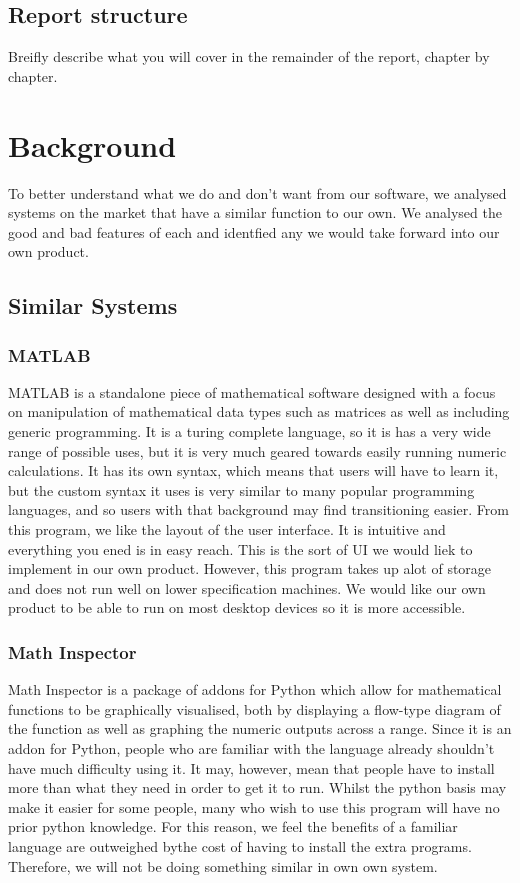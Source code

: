 \documentclass[a4paper, oneside, 11pt]{report}
\begin{document}
\section{Report structure}
Breifly describe what you will cover in the remainder of the report, chapter by chapter.

\chapter{Background}

To better understand what we do and don't want from our software, we analysed systems on the market that have a similar function to our own. We analysed the good and bad features of each and identfied any we would take forward into our own product.

\section{Similar Systems}

\subsection{MATLAB\cite{MATLAB}}

MATLAB is a standalone piece of mathematical software designed with a focus on manipulation of mathematical data types such as matrices as well as including generic programming. 
It is a turing complete language, so it is has a very wide range of possible uses, but it is very much geared towards easily running numeric calculations. It has its own syntax,
which means that users will have to learn it, but the custom syntax it uses is very similar to many popular programming languages, and so users with that background may find transitioning easier.
From this program, we like the layout of the user interface. It is intuitive and everything you ened is in easy reach. This is the sort of UI we would liek to implement in our own product.
However, this program takes up alot of storage and does not run well on lower specification machines. We would like our own product to be able to run on most desktop devices so it is more accessible.

\subsection{Math Inspector\cite{Math_Inspector}}

Math Inspector is a package of addons for Python which allow for mathematical functions to be graphically visualised, both by displaying a flow-type diagram of the function as well as graphing the numeric outputs across a range.
 Since it is an addon for Python, people who are familiar with the language already shouldn't have much difficulty using it. It may, however, mean that people have to install more than what they need in order to get it to run.
Whilst the python basis may make it easier for some people, many who wish to use this program will have no prior python knowledge. For this reason, we feel the benefits of a familiar language are outweighed bythe cost of having to install the extra programs. Therefore, we will not be doing something similar in own own system.
\end{document}
